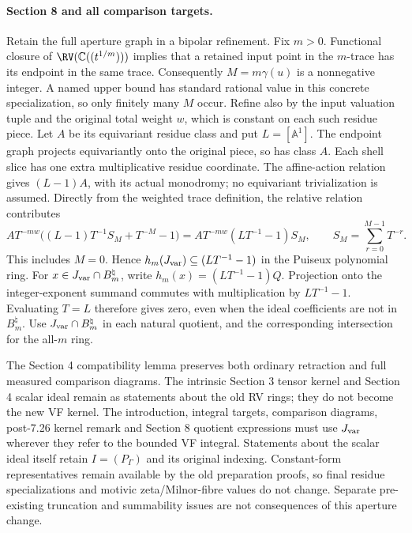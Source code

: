 \paragraph{Section 8 and all comparison targets.}
Retain the full aperture graph in a bipolar refinement. Fix $m>0$.
Functional closure of $\RV(\mathbb C((t^{1/m})))$ implies that a retained
input point in the $m$-trace has its endpoint in the same trace.
Consequently $M=m\gamma(u)$ is a nonnegative integer. A named upper
bound has standard rational value in this concrete specialization,
so only finitely many $M$ occur. Refine also by the input valuation tuple
and the original total weight $w$, which is constant on each such residue
piece. Let $A$ be its equivariant residue class and put $L=[\mathbb A^1]$.
The endpoint graph projects equivariantly onto the original piece, so
has class $A$. Each shell slice has one extra multiplicative residue
coordinate. The affine-action relation gives $(L-1)A$, with its actual
monodromy; no equivariant trivialization is assumed. Directly from the
weighted trace definition, the relative relation contributes
\[
 A T^{-mw}\bigl((L-1)T^{-1}S_M+T^{-M}-1\bigr)
   = A T^{-mw}(LT^{-1}-1)S_M,
 \qquad S_M=\sum_{r=0}^{M-1}T^{-r}.
\]
This includes $M=0$. Hence $h_m(J_{\rm var})\subseteq(LT^{-1}-1)$ in
the Puiseux polynomial ring. For $x\in J_{\rm var}\cap B_m^\natural$,
write $h_m(x)=(LT^{-1}-1)Q$. Projection onto the integer-exponent
summand commutes with multiplication by $LT^{-1}-1$. Evaluating
$T=L$ therefore gives zero, even when the ideal coefficients are not
in $B_m^\natural$. Use $J_{\rm var}\cap B_m^\natural$ in each natural
quotient, and the corresponding intersection for the all-$m$ ring.

The Section 4 compatibility lemma preserves both ordinary retraction
and full measured comparison diagrams. The intrinsic Section 3 tensor
kernel and Section 4 scalar ideal remain as statements about the old
RV rings; they do not become the new VF kernel. The introduction,
integral targets, comparison diagrams, post-7.26 kernel remark and
Section 8 quotient expressions must use $J_{\rm var}$ wherever they
refer to the bounded VF integral. Statements about the scalar ideal
itself retain $I=(P_\Gamma)$ and its original indexing. Constant-form
representatives remain available by the old preparation proofs, so
final residue specializations and motivic zeta/Milnor-fibre values do
not change. Separate pre-existing truncation and summability issues
are not consequences of this aperture change.

